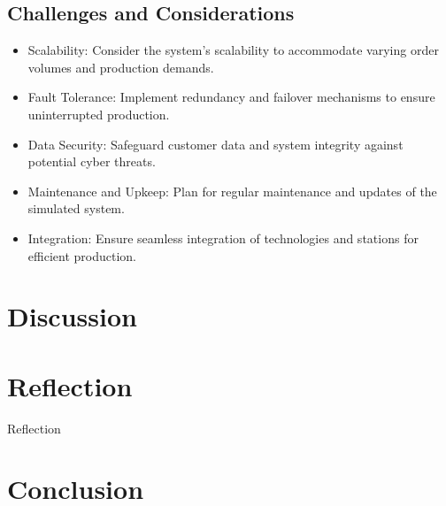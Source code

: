 \documentclass[conference]{IEEEtran}
\begin{document}
\subsection{Challenges and Considerations}

\begin{itemize}
    \item Scalability: Consider the system's scalability to accommodate varying order volumes and production demands.
    
    \item Fault Tolerance: Implement redundancy and failover mechanisms to ensure uninterrupted production.
    
    \item Data Security: Safeguard customer data and system integrity against potential cyber threats.
    
    \item Maintenance and Upkeep: Plan for regular maintenance and updates of the simulated system.
    
    \item Integration: Ensure seamless integration of technologies and stations for efficient production.
\end{itemize}

\section{Discussion}



\section{Reflection}

Reflection


\section{Conclusion}




\vspace{12pt}
\end{document}
